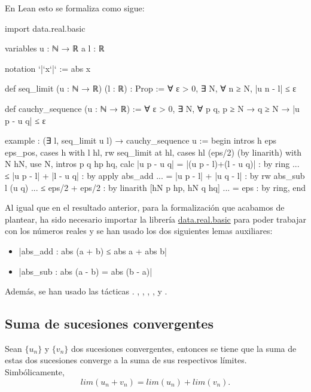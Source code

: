 En Lean esto se formaliza como sigue:
\begin{leancode}
import data.real.basic

variables {u : ℕ → ℝ} {a l : ℝ}

notation `|`x`|` := abs x

def seq_limit (u : ℕ → ℝ) (l : ℝ) : Prop :=
∀ ε > 0, ∃ N, ∀ n ≥ N, |u n - l| ≤ ε

def cauchy_sequence (u : ℕ → ℝ) :=
∀ ε > 0, ∃ N, ∀ p q, p ≥ N → q ≥ N → |u p - u q| ≤ ε

example : (∃ l, seq_limit u l) → cauchy_sequence u :=
begin
  intros h eps eps_pos,
  cases h with l hl,
  rw seq_limit at hl,
  cases hl (eps/2) (by linarith) with N hN,
  use N,
    intros p q hp hq,
  calc  |u p - u q|
      = |(u p - l)+(l - u q)|  : by ring
  ... ≤ |u p - l| + |l - u q|  : by apply abs_add
  ... = |u p - l| + |u q - l|  : by rw abs_sub l (u q)
  ... ≤ eps/2 + eps/2          : by linarith [hN p hp, hN q hq]
  ... = eps                    : by ring,
end
\end{leancode}

Al igual que en el resultado anterior, para la formalización que
acabamos de plantear, ha sido necesario importar la librería
\href{https://github.com/leanprover-community/mathlib/blob/master/src/data/real/basic.lean}
{data.real.basic} para poder trabajar con los números reales y se han
usado los dos siguientes lemas auxiliares:
\begin{itemize}
\item {}|abs_add : abs (a + b) ≤ abs a + abs b|
\item {}|abs_sub : abs (a - b) = abs (b - a)|
\end{itemize}
Además, se han usado las tácticas
.
,
,
,
,
 y
.

\subsection{Suma de sucesiones convergentes}

\begin{teorema}
  Sean \(\{u_n\}\) y \(\{v_n\}\) dos sucesiones convergentes, entonces
  se tiene que la suma de estas dos sucesiones converge a la suma de sus
  respectivos límites. Simbólicamente,
  \begin{equation}
  lim (u_n + v_n) = lim (u_n) + lim (v_n).
  \end{equation}
\end{teorema}

